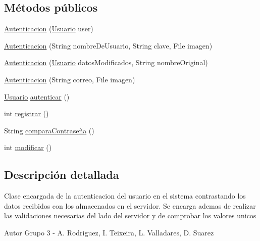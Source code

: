 \subsection*{Métodos públicos}
\begin{DoxyCompactItemize}
\item 
\hyperlink{classcom_1_1ucab_1_1javachat_1_1_servidor_1_1model_1_1_autenticacion_acf6d86eec7551760ec91cc2ad09b5e3d}{Autenticacion} (\hyperlink{classcom_1_1ucab_1_1javachat_1_1_servidor_1_1model_1_1_usuario}{Usuario} user)
\item 
\hyperlink{classcom_1_1ucab_1_1javachat_1_1_servidor_1_1model_1_1_autenticacion_ae16e9a2db61ce5528fc5d024dec17092}{Autenticacion} (String nombre\-De\-Usuario, String clave, File imagen)
\item 
\hyperlink{classcom_1_1ucab_1_1javachat_1_1_servidor_1_1model_1_1_autenticacion_a58448a0f8c2cd4186dc2bf97ef81e2f7}{Autenticacion} (\hyperlink{classcom_1_1ucab_1_1javachat_1_1_servidor_1_1model_1_1_usuario}{Usuario} datos\-Modificados, String nombre\-Original)
\item 
\hyperlink{classcom_1_1ucab_1_1javachat_1_1_servidor_1_1model_1_1_autenticacion_a73bb46aee6ae1f6741ebb4cf73763efc}{Autenticacion} (String correo, File imagen)
\item 
\hyperlink{classcom_1_1ucab_1_1javachat_1_1_servidor_1_1model_1_1_usuario}{Usuario} \hyperlink{classcom_1_1ucab_1_1javachat_1_1_servidor_1_1model_1_1_autenticacion_abd542a51e7aca4eb713e823a82b83673}{autenticar} ()
\item 
int \hyperlink{classcom_1_1ucab_1_1javachat_1_1_servidor_1_1model_1_1_autenticacion_a14e19bd0d14451bb87fd62bdd74b15d7}{registrar} ()
\item 
String \hyperlink{classcom_1_1ucab_1_1javachat_1_1_servidor_1_1model_1_1_autenticacion_ae18b837b59ef28f09723e6d772b5d26d}{compara\-Contraseña} ()
\item 
int \hyperlink{classcom_1_1ucab_1_1javachat_1_1_servidor_1_1model_1_1_autenticacion_a8c809a9a3e8bc1cf8590aa6ec6a45285}{modificar} ()
\end{DoxyCompactItemize}


\subsection{Descripción detallada}
Clase encargada de la autenticacion del usuario en el sistema contrastando los datos recibidos con los almacenados en el servidor. Se encarga ademas de realizar las validaciones necesarias del lado del servidor y de comprobar los valores unicos \begin{DoxyAuthor}{Autor}
Grupo 3 -\/ A. Rodriguez, I. Teixeira, L. Valladares, D. Suarez 
\end{DoxyAuthor}


